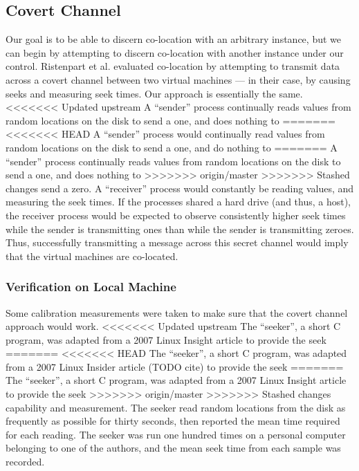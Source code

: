 \documentclass[conference]{IEEEtran}
\begin{document}
\subsection{Covert Channel}
Our goal is to be able to discern co-location with an arbitrary instance, but we can begin by attempting to discern
  co-location with another instance under our control.
Ristenpart et al. evaluated co-location by attempting to transmit data across a covert channel between two virtual
  machines --- in their case, by causing seeks and measuring seek times. Our approach is essentially the same.
<<<<<<< Updated upstream
A ``sender'' process continually reads values from random locations on the disk to send a one, and does nothing to
=======
<<<<<<< HEAD
A ``sender'' process would continually read values from random locations on the disk to send a one, and do nothing to
=======
A ``sender'' process continually reads values from random locations on the disk to send a one, and does nothing to
>>>>>>> origin/master
>>>>>>> Stashed changes
  send a zero.
A ``receiver'' process would constantly be reading values, and measuring the seek times.
If the processes shared a hard drive (and thus, a host), the receiver process would be expected to observe consistently
  higher seek times while the sender is transmitting ones than while the sender is transmitting zeroes.
Thus, successfully transmitting a message across this secret channel would imply that the virtual machines are
  co-located.

\subsubsection{Verification on Local Machine}
Some calibration measurements were taken to make sure that the covert channel approach would work.
<<<<<<< Updated upstream
The ``seeker'', a short C program, was adapted from a 2007 Linux Insight article \cite{seeker07} to provide the seek
=======
<<<<<<< HEAD
The ``seeker'', a short C program, was adapted from a 2007 Linux Insider article (TODO cite) to provide the seek
=======
The ``seeker'', a short C program, was adapted from a 2007 Linux Insight article \cite{seeker07} to provide the seek
>>>>>>> origin/master
>>>>>>> Stashed changes
  capability and measurement.
The seeker read random locations from the disk as frequently as possible for thirty seconds, then reported the mean
  time required for each reading.
The seeker was run one hundred times on a personal computer belonging to one of the authors, and the mean seek time
  from each sample was recorded.
\end{document}
